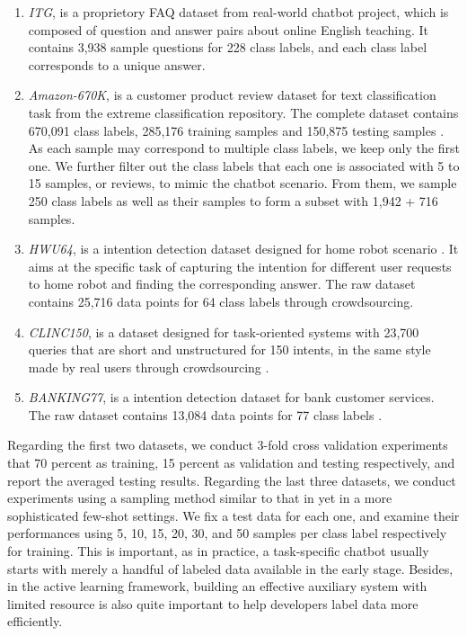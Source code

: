 \begin{enumerate}
  \item \emph{ITG},  is  a proprietory FAQ dataset from real-world
  chatbot  project,  which is composed of question and answer pairs about online
  English teaching. It contains 3,938 sample questions for 228 class labels, and
  each class label corresponds to a unique answer.

  \item \emph{Amazon-670K}, is a customer product review dataset for
  text  classification  task  from  the  extreme  classification repository. The
  complete  dataset  contains 670,091 class labels, 285,176 training samples and
  150,875   testing   samples   \cite{bhatia2016extreme}.  As  each  sample  may
  correspond  to  multiple  class labels, we keep only the first one. We further
  filter  out the class labels that each one is associated with 5 to 15 samples,
  or  reviews,  to  mimic  the  chatbot scenario. From them, we sample 250 class
  labels as well as their samples to form a subset with 1,942 + 716 samples.

  \item \emph{HWU64}, is a intention detection dataset designed for
  home  robot  scenario \cite{liu2019benchmarking}. It aims at the specific task
  of  capturing  the  intention  for  different  user requests to home robot and
  finding  the corresponding answer. The raw dataset contains 25,716 data points
  for 64 class labels through crowdsourcing.

  \item \emph{CLINC150},  is  a dataset designed for task-oriented
  systems  with  23,700 queries that are short and unstructured for 150 intents,
  in    the    same   style   made   by   real   users   through   crowdsourcing
  \cite{larson2019evaluation}.

  \item \emph{BANKING77}, is a intention detection dataset for bank
  customer  services.  The  raw dataset contains 13,084 data points for 77 class
  labels \cite{casanueva2020efficient}.
\end{enumerate}

Regarding  the first two datasets, we conduct 3-fold cross validation experiments
that   70   percent   as  training,  15  percent  as  validation  and  testing
respectively,  and  report  the  averaged  testing results. Regarding the last
three datasets, we conduct experiments using a sampling method similar to that
in   \cite{casanueva2020efficient}   yet  in  a  more  sophisticated  few-shot
settings.  We  fix  a  test  data for each one, and examine their performances
using  5,  10,  15,  20,  30,  and 50 samples per class label respectively for
training.  This  is important, as in practice, a task-specific chatbot usually
starts  with  merely  a  handful of labeled data available in the early stage.
Besides,  in  the  active  learning framework, building an effective auxiliary
system  with limited resource is also quite important to help developers label
data more efficiently.

